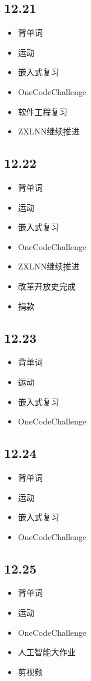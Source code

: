 \documentclass[UTF8]{ctexart}
\begin{document}
\subsection*{12.21}
\begin{itemize}
    \item 背单词
    \item 运动
    \item 嵌入式复习
    \item OneCodeChallenge
    \item 软件工程复习
    \item ZXLNN继续推进
\end{itemize}

\subsection*{12.22}
\begin{itemize}
    \item 背单词
    \item 运动
    \item 嵌入式复习
    \item OneCodeChallenge
    \item ZXLNN继续推进
    \item 改革开放史完成
    \item 捐款
\end{itemize}

\subsection*{12.23}
\begin{itemize}
    \item 背单词
    \item 运动
    \item 嵌入式复习
    \item OneCodeChallenge
\end{itemize}

\subsection*{12.24}
\begin{itemize}
    \item 背单词
    \item 运动
    \item 嵌入式复习
    \item OneCodeChallenge
\end{itemize}

\subsection*{12.25}
\begin{itemize}
    \item 背单词
    \item 运动
    \item OneCodeChallenge
    \item 人工智能大作业
    \item 剪视频
\end{itemize}
\end{document}
